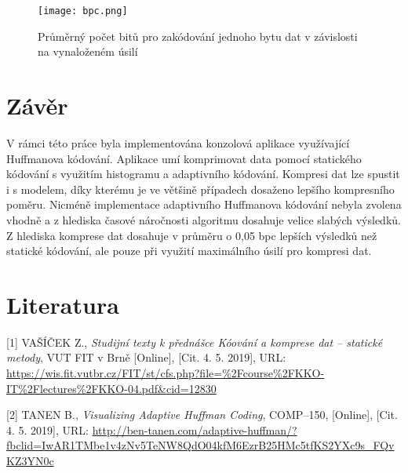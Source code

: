 \documentclass[11pt,a4paper,titlepage]{article}
\begin{document}
        \newpage

        \begin{figure}[htbp]
            \begin{center}
                \texttt{[image: bpc.png]}
                \caption{Průměrný počet bitů pro zakódování jednoho bytu dat v závislosti na vynaloženém úsilí}
            \end{center}
        \end{figure}

    \section{Závěr}
        V rámci této práce byla implementována konzolová aplikace využívající Huffmanova kódování. Aplikace umí komprimovat data pomocí
        statického kódování s využitím histogramu a adaptivního kódování. Kompresi dat lze spustit i s modelem, díky kterému je ve většině
        případech dosaženo lepšího kompresního poměru. Nicméně implementace adaptivního Huffmanova kódování nebyla zvolena vhodně a z hlediska
        časové náročnosti algoritmu dosahuje velice slabých výsledků. Z hlediska komprese dat dosahuje v průměru o 0,05 bpc lepších výsledků
        než statické kódování, ale pouze při využití maximálního úsilí pro kompresi dat.

    \section{Literatura}
        [1] VAŠÍČEK Z., \textit{Studijní texty k přednášce Kóování a komprese dat -- statické metody}, VUT FIT v Brně [Online], [Cit. 4. 5. 2019], URL: \url{https://wis.fit.vutbr.cz/FIT/st/cfs.php?file=%2Fcourse%2FKKO-IT%2Flectures%2FKKO-04.pdf&cid=12830}

        [2] TANEN B., \textit{Visualizing Adaptive Huffman Coding}, COMP--150, [Online], [Cit. 4. 5. 2019], URL: \url{http://ben-tanen.com/adaptive-huffman/?fbclid=IwAR1TMbe1v4zNv5TeNW8QdO04kfM6EzrB25HMc5tfKS2YXc9s_FQvKZ3YN0c}
\end{document}
